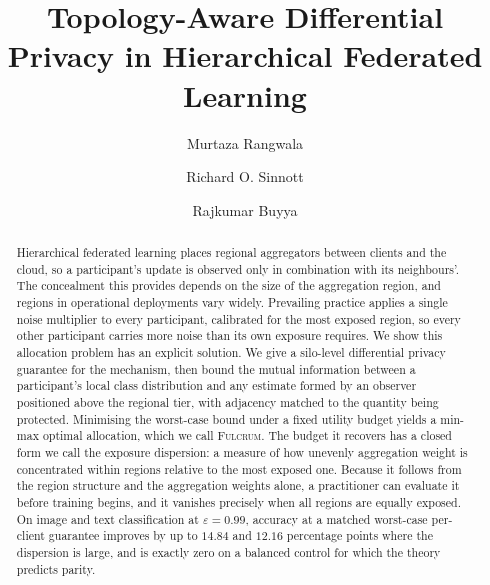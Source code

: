 \documentclass[acmsmall,screen,review,anonymous]{acmart}
\theoremstyle{acmdefinition}%
\newcommand{\Fulcrum}{\textsc{Fulcrum}\xspace}
\begin{document}
\title{Topology-Aware Differential Privacy in Hierarchical Federated Learning}

\author{Murtaza Rangwala}

\author{Richard O. Sinnott}

\author{Rajkumar Buyya}

\renewcommand{\shortauthors}{Rangwala et al.}

\begin{abstract}
Hierarchical federated learning places regional aggregators between clients and the
cloud, so a participant's update is observed only in combination with its neighbours'.
The concealment this provides depends on the size of the aggregation region, and regions
in operational deployments vary widely. Prevailing practice applies a single noise
multiplier to every participant, calibrated for the most exposed region, so every other
participant carries more noise than its own exposure requires. We show this allocation
problem has an explicit solution. We give a silo-level differential privacy guarantee for
the mechanism, then bound the mutual information between a participant's local class
distribution and any estimate formed by an observer positioned above the regional tier,
with adjacency matched to the quantity being protected. Minimising the worst-case bound
under a fixed utility budget yields a min-max optimal allocation, which we call \Fulcrum.
The budget it recovers has a closed form we call the exposure dispersion: a measure of how
unevenly aggregation weight is concentrated within regions relative to the most exposed
one. Because it follows from the region structure and the aggregation weights alone, a
practitioner can evaluate it before training begins, and it vanishes precisely when all
regions are equally exposed. On image and text classification at $\varepsilon = 0.99$,
accuracy at a matched worst-case per-client guarantee improves by up to $14.84$ and
$12.16$ percentage points where the dispersion is large, and is exactly zero on a balanced
control for which the theory predicts parity.
\end{abstract}
\end{document}
